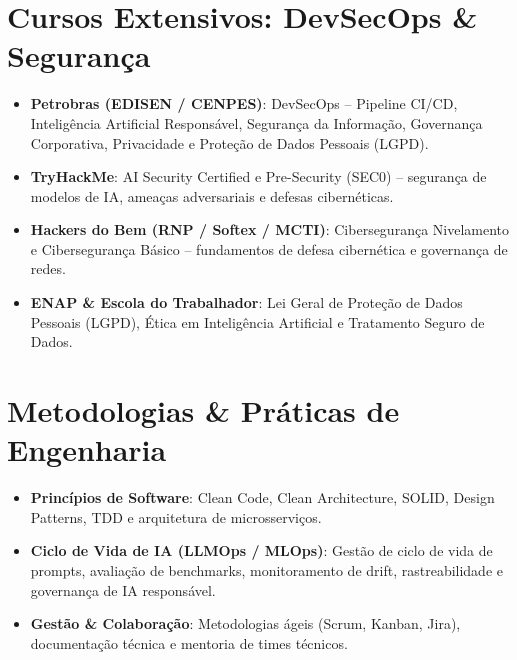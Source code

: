 \documentclass[singlesided,
               paper=a4,
               fontsize=9.5pt
              ]{my-resume}
\begin{document}
{    \section[\faLock]{Cursos Extensivos: DevSecOps \& Seguran\c{c}a}
    \begin{itemize}
        \item \textbf{Petrobras (EDISEN / CENPES)}: DevSecOps -- Pipeline CI/CD, Intelig\^{e}ncia Artificial Respons\'{a}vel, Seguran\c{c}a da Informa\c{c}\~{a}o, Governan\c{c}a Corporativa, Privacidade e Prote\c{c}\~{a}o de Dados Pessoais (LGPD).
        \item \textbf{TryHackMe}: AI Security Certified e Pre-Security (SEC0) -- seguran\c{c}a de modelos de IA, amea\c{c}as adversariais e defesas cibern\'{e}ticas.
        \item \textbf{Hackers do Bem (RNP / Softex / MCTI)}: Ciberseguran\c{c}a Nivelamento e Ciberseguran\c{c}a B\'{a}sico -- fundamentos de defesa cibern\'{e}tica e governan\c{c}a de redes.
        \item \textbf{ENAP \& Escola do Trabalhador}: Lei Geral de Prote\c{c}\~{a}o de Dados Pessoais (LGPD), \'{E}tica em Intelig\^{e}ncia Artificial e Tratamento Seguro de Dados.
    \end{itemize}

    \vspace{0.25em}
    \section[\faCheckCircle]{Metodologias \& Pr\'{a}ticas de Engenharia}
    \begin{itemize}
        \item \textbf{Princ\'{i}pios de Software}: Clean Code, Clean Architecture, SOLID, Design Patterns, TDD e arquitetura de microsservi\c{c}os.
        \item \textbf{Ciclo de Vida de IA (LLMOps / MLOps)}: Gest\~{a}o de ciclo de vida de prompts, avalia\c{c}\~{a}o de benchmarks, monitoramento de drift, rastreabilidade e governan\c{c}a de IA respons\'{a}vel.
        \item \textbf{Gest\~{a}o \& Colabora\c{c}\~{a}o}: Metodologias \'{a}geis (Scrum, Kanban, Jira), documenta\c{c}\~{a}o t\'{e}cnica e mentoria de times t\'{e}cnicos.
    \end{itemize}
}

\makebody
\end{document}

